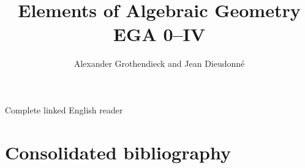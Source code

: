 


\setlength{\emergencystretch}{3em}


\newcommand{\EGAResetVolumeCounters}{%
  \setcounter{section}{0}%
  \setcounter{subsection}{0}%
  \setcounter{equation}{0}%
  \setcounter{figure}{0}%
  \setcounter{table}{0}%
  \setcounter{footnote}{0}%
}

\newcommand{\EGAVolumeTitlePage}[3]{%
  \clearpage
  \EGAResetVolumeCounters
  \renewcommand*{\theHtable}{#1.\arabic{table}}%
  \phantomsection
  \label{section:#1}%
  \pdfbookmark[0]{#2: #3}{volume.#1}%
  \addcontentsline{toc}{part}{#2: #3}%
  \thispagestyle{empty}%
  \vspace*{\fill}%
  \begin{center}
    {\Huge\bfseries #2\par}
    \vspace{1.5em}
    {\LARGE #3\par}
    \vspace{2em}
    {\large Alexander Grothendieck and Jean Dieudonn\'e\par}
    \vspace{1em}
    {\large Complete English reader\par}
  \end{center}
  \vspace*{\fill}%
  \clearpage
}



\title{Elements of Algebraic Geometry\\EGA 0--IV}
\author{Alexander Grothendieck and Jean Dieudonn\'e}
\date{}
\maketitle

\label{reader:ega-global}

\begin{center}
\large Complete linked English reader
\end{center}

\tableofcontents







\clearpage
{}
{}
\section*{Consolidated bibliography}
\nocite{*}




